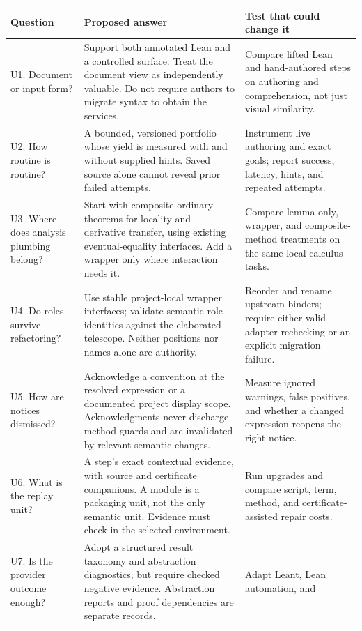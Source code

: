 \documentclass[11pt,letterpaper]{article}
\renewcommand{\arraystretch}{1.15}
\theoremstyle{definition}
\begin{document}
\begingroup\small\renewcommand{\arraystretch}{1.08}
\begin{longtable}{@{}P{.21\textwidth}P{.43\textwidth}P{.28\textwidth}@{}}
\toprule
Question & Proposed answer & Test that could change it \\
\midrule
\endhead
U1. Document or input form? & Support both annotated Lean and a controlled surface.
Treat the document view as independently valuable. Do not require authors to
migrate syntax to obtain the services. & Compare lifted Lean and hand-authored
steps on authoring and comprehension, not just visual similarity.\\
U2. How routine is routine? & A bounded, versioned portfolio whose yield is
measured with and without supplied hints. Saved source alone cannot reveal prior
failed attempts. & Instrument live authoring and exact goals; report success,
latency, hints, and repeated attempts.\\
U3. Where does analysis plumbing belong? & Start with composite ordinary theorems
for locality and derivative transfer, using existing eventual-equality interfaces.
Add a wrapper only where interaction needs it. & Compare lemma-only, wrapper, and
composite-method treatments on the same local-calculus tasks.\\
U4. Do roles survive refactoring? & Use stable project-local wrapper interfaces;
validate semantic role identities against the elaborated telescope. Neither
positions nor names alone are authority. & Reorder and rename upstream binders;
require either valid adapter rechecking or an explicit migration failure.\\
U5. How are notices dismissed? & Acknowledge a convention at the resolved expression
or a documented project display scope. Acknowledgments never discharge method
guards and are invalidated by relevant semantic changes. & Measure ignored warnings,
false positives, and whether a changed expression reopens the right notice.\\
U6. What is the replay unit? & A step's exact contextual evidence, with source and
certificate companions. A module is a packaging unit, not the only semantic unit.
Evidence must check in the selected environment. & Run upgrades and compare script,
term, method, and certificate-assisted repair costs.\\
U7. Is the provider outcome enough? & Adopt a structured result taxonomy and
abstraction diagnostics, but require checked negative evidence. Abstraction reports
and proof dependencies are separate records. & Adapt Leant, Lean automation, and

\end{longtable}
\end{document}
